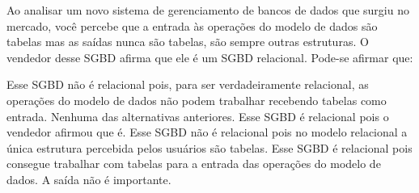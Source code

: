 \documentclass[12pt, addpoints]{exam}
\begin{document}
\begin{questions}
\question
Ao analisar um novo sistema de gerenciamento de bancos de dados que surgiu no
mercado, você percebe que a entrada às operações do modelo de dados são tabelas
mas as saídas nunca são tabelas, são sempre outras estruturas. O vendedor desse
SGBD afirma que ele é um SGBD relacional. Pode-se afirmar que:

\begin{choices}
\choice Esse SGBD não é relacional pois, para ser verdadeiramente relacional, as operações do modelo de dados não podem trabalhar recebendo tabelas como entrada.
\choice Nenhuma das alternativas anteriores.
\choice Esse SGBD é relacional pois o vendedor afirmou que é.
\choice Esse SGBD não é relacional pois no modelo relacional a única estrutura percebida pelos usuários são tabelas.
\choice Esse SGBD é relacional pois consegue trabalhar com tabelas para a entrada das operações do modelo de dados. A saída não é importante.
\end{choices}



    \end{questions}
    
\end{document}
